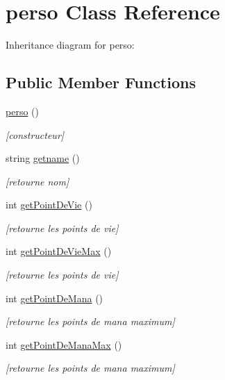 \hypertarget{classperso}{}\section{perso Class Reference}
\label{classperso}


Inheritance diagram for perso\+:
\subsection*{Public Member Functions}
\begin{DoxyCompactItemize}
\item 
\hyperlink{classperso_af0f49599683fc9a7637ca6e650fbf4aa}{perso} ()
\begin{DoxyCompactList}\small\item\em \mbox{[}constructeur\mbox{]} \end{DoxyCompactList}\item 
string \hyperlink{classperso_a489870c6f4a1a929ce46d02e628ee9ab}{getname} ()
\begin{DoxyCompactList}\small\item\em \mbox{[}retourne nom\mbox{]} \end{DoxyCompactList}\item 
int \hyperlink{classperso_a9391f03615788fb5a66ecf2f7b482c89}{get\+Point\+De\+Vie} ()
\begin{DoxyCompactList}\small\item\em \mbox{[}retourne les points de vie\mbox{]} \end{DoxyCompactList}\item 
int \hyperlink{classperso_a131f5374175f496da30cd1e4c2dc9d2a}{get\+Point\+De\+Vie\+Max} ()
\begin{DoxyCompactList}\small\item\em \mbox{[}retourne les points de vie\mbox{]} \end{DoxyCompactList}\item 
int \hyperlink{classperso_aaaa0f1cc177edd679882932937e96037}{get\+Point\+De\+Mana} ()
\begin{DoxyCompactList}\small\item\em \mbox{[}retourne les points de mana maximum\mbox{]} \end{DoxyCompactList}\item 
int \hyperlink{classperso_a8bfd2543dc26ba198896e682ebed9359}{get\+Point\+De\+Mana\+Max} ()
\begin{DoxyCompactList}\small\item\em \mbox{[}retourne les points de mana maximum\mbox{]} \end{DoxyCompactList}\item 

\end{DoxyCompactItemize}
